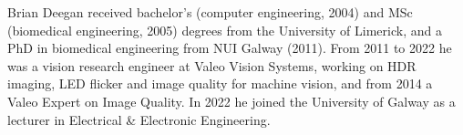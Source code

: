 \documentclass[letterpaper,twocolumn,fleqn]{article}
\begin{document}
\small



\begin{biography}
Brian Deegan received bachelor's (computer engineering, 2004) and MSc (biomedical engineering, 2005) degrees from the University of Limerick, and a PhD in biomedical engineering from NUI Galway (2011). From 2011 to 2022 he was a vision research engineer at Valeo Vision Systems, working on HDR imaging, LED flicker and image quality for machine vision, and from 2014 a Valeo Expert on Image Quality. In 2022 he joined the University of Galway as a lecturer in Electrical \& Electronic Engineering.
\end{biography}
\end{document}
